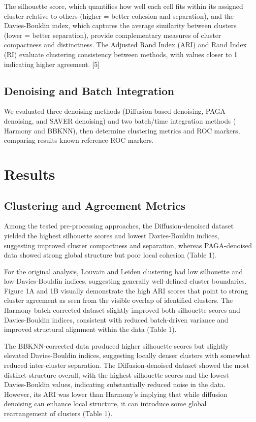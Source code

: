 \documentclass[11pt]{article}
\begin{document}
The silhouette score, which quantifies how well each cell fits within its assigned cluster relative to others (higher = better cohesion and separation), and the Davies-Bouldin index, which captures the average similarity between clusters (lower = better separation), provide complementary measures of cluster compactness and distinctness. The Adjusted Rand Index (ARI) and Rand Index (RI) evaluate clustering consistency between methods, with values closer to 1 indicating higher agreement. [5]

\subsection{Denoising and Batch Integration}
We evaluated three denoising methods (Diffusion-based denoising, PAGA denoising, and SAVER denoising) and two batch/time integration methods ( Harmony and BBKNN), then determine clustering metrics and ROC markers, comparing results known reference ROC markers.

\section{Results}
\subsection{Clustering and Agreement Metrics}
Among the tested pre-processing approaches, the Diffusion-denoised dataset yielded the highest silhouette scores and lowest Davies-Bouldin indices, suggesting improved cluster compactness and separation, whereas PAGA-denoised data showed strong global structure but poor local cohesion (Table 1). 

For the original analysis, Louvain and Leiden clustering had low silhouette and low Davies-Bouldin indices, suggesting generally well-defined cluster boundaries. Figure 1A and 1B visually demonstrate the high ARI scores that point to strong cluster agreement as seen from the visible overlap of identified clusters. The Harmony batch-corrected dataset slightly improved both silhouette scores and Davies-Bouldin indices, consistent with reduced batch-driven variance and improved structural alignment within the data (Table 1). 

The BBKNN-corrected data produced higher silhouette scores but slightly elevated Davies-Bouldin indices, suggesting locally denser clusters with somewhat reduced inter-cluster separation. The Diffusion-denoised dataset showed the most distinct structure overall, with the highest silhouette scores and the lowest Davies-Bouldin values, indicating substantially reduced noise in the data. However, its ARI was lower than Harmony's implying that while diffusion denoising can enhance local structure, it can introduce some global rearrangement of clusters (Table 1).
\end{document}
